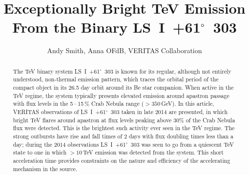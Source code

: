 \documentclass[preprint2]{aastex}
\newcommand{\tapp}{\raisebox{0.5ex}{\texttildelow}}
\newcommand{\lsi}{LS~I~+61$^{\circ}$~303}
\newcommand{\gev}{\,GeV}
\newcommand{\tev}{\,TeV}
\begin{document}

\title{Exceptionally Bright TeV Emission From the Binary \lsi{}}


\author{
Andy Smith,
Anna OFdB,
VERITAS Collaboration
}




\begin{abstract}
The TeV binary system \lsi{} is known for its regular, although not entirely understood, non-thermal emission pattern, which traces the orbital period of the compact object in its 26.5 day orbit around its Be star companion. When active in the TeV regime, the system typically presents elevated emission around apastron passage with flux levels in the 5\,--\,15\,\% Crab Nebula range ($>350$\gev{}). In this article, VERITAS observations of \lsi{} taken in late 2014 are presented, in which bright TeV flares around apastron at flux levels peaking above $30\%$ of the Crab Nebula flux were detected. This is the brightest such activity ever seen in the TeV regime. The strong outbursts have rise and fall times of \tapp{}$2$ days with flux doubling times less than a day; during the 2014 observations \lsi{} was seen to go from a quiescent TeV state to one in which $>10$\tev{} emission was detected from the system. This short acceleration time provides constraints on the nature and efficiency of the accelerating mechanism in the source.
\end{abstract}
\end{document}
